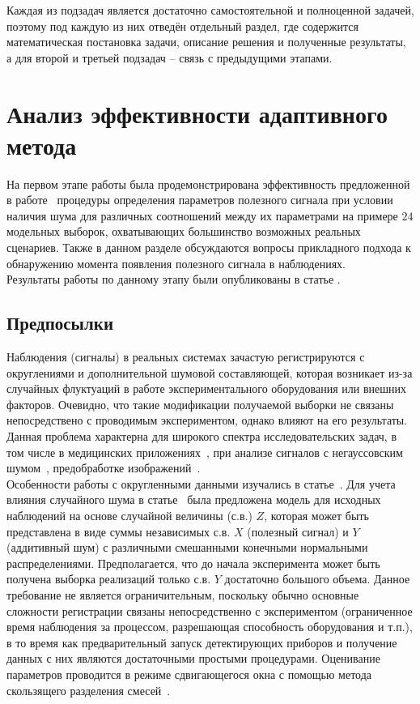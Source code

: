 \documentclass[oneside,senior,etd]{BYUPhys}
\begin{document}
	Каждая из подзадач является достаточно самостоятельной и полноценной задачей, поэтому под каждую из них отведён отдельный раздел, где содержится математическая постановка задачи, описание решения и полученные результаты, а для второй и третьей подзадач -- связь с предыдущими этапами.

\section{Анализ эффективности адаптивного метода}
	На первом этапе работы была продемонстрирована эффективность предложенной в работе~\cite{gorshenin2019adaptive} процедуры определения параметров полезного сигнала при условии наличия шума для различных соотношений между их параметрами на примере $24$ модельных выборок, охватывающих большинство возможных реальных сценариев. Также в данном разделе обсуждаются вопросы прикладного подхода к обнаружению момента появления полезного сигнала в наблюдениях.
	\\
	
	Результаты работы по данному этапу были опубликованы в статье \cite{gorshenin2020efficiency}.
	
	\subsection{Предпосылки}
		Наблюдения (сигналы) в реальных системах зачастую регистрируются с округлениями и дополнительной шумовой составляющей, которая возникает из-за случайных флуктуаций в работе экспериментального оборудования или внешних факторов. Очевидно, что такие модификации получаемой выборки не связаны непосредствено с проводимым экспериментом, однако влияют на его результаты. Данная проблема характерна для широкого спектра исследовательских задач, в том числе в медицинских приложениях~\cite{marquez2020optimal, almgren2020effect}, при анализе сигналов с негауссовским шумом~\cite{asadi2018signal, ilter2019joint, guo2020enhanced}, предобработке изображений~\cite{li2019noise}.
		\\
		
		Особенности работы с округленными данными изучались в статье~\cite{gorshenin2018data}. Для учета влияния случайного шума в статье~\cite{gorshenin2019adaptive} была предложена модель для исходных наблюдений на основе случайной величины (с.в.) $Z$, которая может быть представлена в виде суммы независимых с.в. $X$ (полезный сигнал) и $Y$ (аддитивный шум) с различными смешанными конечными нормальными распределениями. Предполагается, что до начала эксперимента может быть получена выборка реализаций только с.в. $Y$ достаточно большого объема. Данное требование не является ограничительным, поскольку обычно основные сложности регистрации связаны непосредственно с экспериментом (ограниченное время наблюдения за процессом, разрешающая способность оборудования и т.п.), в то время как предварительный запуск детектирующих приборов и получение данных с них являются достаточными простыми процедурами. Оценивание параметров проводится в режиме сдвигающегося окна с помощью метода скользящего разделения смесей~\cite{korolev2011probabilistic}.
	
\end{document}
